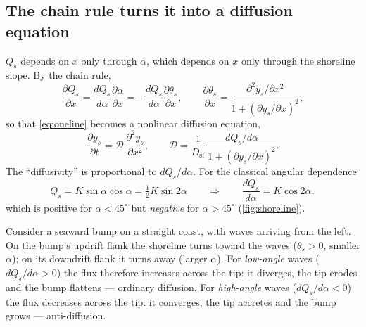\documentclass[11pt,letterpaper]{article}
\numberwithin{equation}{section}
\newcommand{\pd}[2]{\frac{\partial #1}{\partial #2}}
\newcommand{\pdd}[2]{\frac{\partial^2 #1}{\partial #2^2}}
\newcommand{\od}[2]{\frac{d #1}{d #2}}
\begin{document}
\subsection{The chain rule turns it into a diffusion equation}
$Q_s$ depends on $x$ only through $\alpha$, which depends on $x$ only through the shoreline slope. By the chain rule,
\[
\pd{Q_s}{x}=\od{Q_s}{\alpha}\pd{\alpha}{x}=-\od{Q_s}{\alpha}\pd{\theta_s}{x},\qquad
\pd{\theta_s}{x}=\frac{\partial^2y_s/\partial x^2}{1+(\partial y_s/\partial x)^2},
\]
so that \eqref{eq:oneline} becomes a nonlinear diffusion equation,
\begin{equation}\label{eq:shorediff}
\pd{y_s}{t}=\mathcal{D}\,\pdd{y_s}{x},\qquad
\mathcal{D}=\frac{1}{D_{\mathrm{sf}}}\,\frac{dQ_s/d\alpha}{1+(\partial y_s/\partial x)^2}.
\end{equation}
The ``diffusivity'' is proportional to $dQ_s/d\alpha$. For the classical angular dependence
\[
Q_s=K\sin\alpha\cos\alpha=\tfrac12K\sin2\alpha\qquad\Longrightarrow\qquad \od{Q_s}{\alpha}=K\cos2\alpha ,
\]
which is positive for $\alpha<45^\circ$ but \emph{negative} for $\alpha>45^\circ$ (\cref{fig:shoreline}).

\begin{keyidea}
Consider a seaward bump on a straight coast, with waves arriving from the left. On the bump's updrift flank the shoreline turns toward
the waves ($\theta_s>0$, smaller $\alpha$); on its downdrift flank it turns away (larger $\alpha$). For \emph{low-angle} waves
($dQ_s/d\alpha>0$) the flux therefore increases across the tip: it diverges, the tip erodes and the bump flattens --- ordinary
diffusion. For \emph{high-angle} waves ($dQ_s/d\alpha<0$) the flux decreases across the tip: it converges, the tip accretes and the bump
grows --- anti-diffusion.
\end{keyidea}
\end{document}
